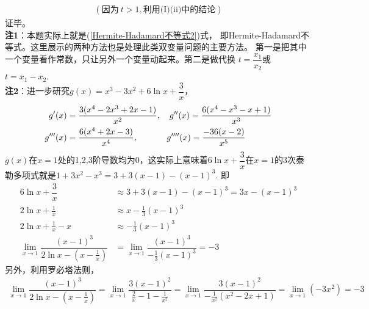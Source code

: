 \begin{enumerate}[label={【\textbf{例\thechapter.\arabic*}】},
 leftmargin=\inteval{\myenumleftmargin}pt,
 itemsep=\inteval{\myenumitempsep}pt,
 itemindent=\inteval{\myenumitemindent}pt]
\begin{align*}
    (\text{因为}\ t>1, \text{利用(I)(ii)中的结论}) 
\end{align*}
证毕。\\
\textbf{注1}：本题实际上就是(\ref{Hermite-Hadamard不等式2})式，
即Hermite-Hadamard不等式。这里展示的两种方法也是处理此类双变量问题的主要方法。
第一是把其中一个变量看作常数，只让另外一个变量动起来。第二是做代换
$ t=\dfrac{x_1}{x_2} $或$ t=x_1-x_2 $.\\
\textbf{注2}：进一步研究$ g(x)=x^3-3x^2+6\ln x+\dfrac{3}{x} $，
\begin{align*}
    g'(x) &=\dfrac{3(x^4-2x^3+2x-1)}{x^2},\quad 
    g''(x) =\frac{6(x^4-x^3-x+1)}{x^3} \\
    g'''(x) &=\frac{6(x^4+2x-3)}{x^4},\hspace{1.2cm} 
    g''''(x) =\frac{-36(x-2)}{x^5} 
\end{align*}
$ g(x) $在$ x=1 $处的1,2,3阶导数均为0，这实际上意味着$ 6\ln x+
\dfrac{3}{x} $在$ x=1 $的3次泰勒多项式就是$ 1+3x^2-x^3=3+3(x-1)
-(x-1)^3 $. 即
\begin{align*}
    6\ln x+\dfrac{3}{x} &\approx 3+3(x-1)-(x-1)^3=3x-(x-1)^3 \\
    2\ln x+\frac{1}{x} & \approx x-\frac{1}{3}(x-1)^3 \\
    2\ln x+\frac{1}{x} -x & \approx -\frac{1}{3}(x-1)^3 \\
    \lim_{x\to 1}\dfrac{(x-1)^3}{2\ln x-\left(x-\frac{1}{x}
        \right)} &=\lim_{x\to 1}\dfrac{(x-1)^3}{-\frac{1}{3}(x-1)^3}=-3
\end{align*}
另外，利用罗必塔法则，
\begin{gather*}
    \lim_{x\to 1}\dfrac{(x-1)^3}{2\ln x-\left(x-\frac{1}{x}\right)}=
    \lim_{x\to 1}\dfrac{3(x-1)^2}{\frac{2}{x}-1-\frac{1}{x^2}}=
    \lim_{x\to 1}\dfrac{3(x-1)^2}{-\frac{1}{x^2}\left(x^2-2x+1\right)}=
    \lim_{x\to 1}(-3x^2)=-3
\end{gather*}


\end{enumerate}
